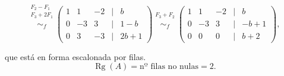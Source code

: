 \documentclass[a4paper,12pt]{article}
\begin{document}
\begin{ejercicio}[title=Ejercicio 31]
\begin{itemize}
\[
\overset{\substack{F_2 - F_1 \\ F_3 + 2F_1\\{}}}{\sim_f}
\begin{pmatrix}
1 & 1 & -2 &\Big|& b\\
0 & -3 & 3 &\Big|& 1-b\\
0 & 3 & -3 &\Big|& 2b+1
\end{pmatrix}
\overset{\substack{F_3 + F_2\\{}}}{\sim_f}
\begin{pmatrix}
1 & 1 & -2 &\Big|& b\\
0 & -3 & 3 &\Big|& -b+1\\
0 & 0 & 0 &\Big|& b+2
\end{pmatrix},
\]

que está en forma escalonada por filas.
\[
\operatorname{Rg}(A)=\text{nº filas no nulas}=2.
\]
\end{itemize}
\end{ejercicio}
\end{document}

